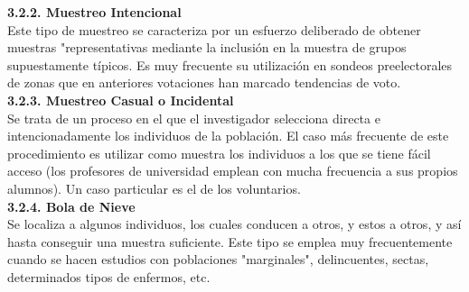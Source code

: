 \documentclass[base=hide,11pt]{elegantbook}
\begin{document}
{\textcolor{col4}{\bf \large 3.2.2. Muestreo Intencional}\\ 
Este tipo de muestreo se caracteriza por un esfuerzo deliberado de obtener muestras "representativas mediante la inclusión en la muestra de grupos supuestamente típicos. Es muy frecuente su utilización en sondeos preelectorales de zonas que en anteriores votaciones han marcado tendencias de voto.\\
			
\textcolor{col4}{\bf \large 3.2.3. Muestreo Casual o Incidental}\\ 
Se trata de un proceso en el que el investigador selecciona directa e intencionadamente los individuos de la población. El caso más frecuente de este procedimiento es utilizar como muestra los individuos a los que se tiene fácil acceso (los profesores de universidad emplean con mucha frecuencia a sus propios alumnos). Un caso particular es el de los voluntarios.\\
			
\textcolor{col4}{\bf \large 3.2.4. Bola de Nieve}\\ 
Se localiza a algunos individuos, los cuales conducen a otros, y estos a otros, y así hasta conseguir una muestra suficiente. Este tipo se emplea muy frecuentemente cuando se hacen estudios con poblaciones "marginales", delincuentes, sectas, determinados tipos de enfermos, etc.\\
			
}
\end{document}
